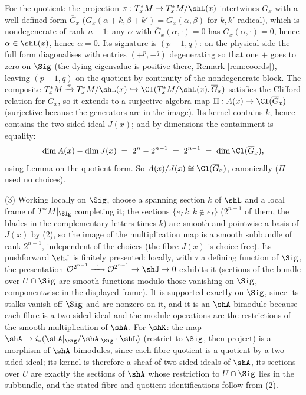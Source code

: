 For the quotient: the projection $\pi : T^*_xM \to T^*_xM/\shL(x)$ intertwines $G_x$ with a well-defined form $\overline{G}_x$ ($G_x(\alpha + k, \beta + k') = G_x(\alpha, \beta)$ for $k, k'$ radical), which is nondegenerate of rank $n - 1$: any $\alpha$ with $\overline{G}_x(\bar\alpha, \cdot) = 0$ has $G_x(\alpha, \cdot) = 0$, hence $\alpha \in \shL(x)$, hence $\bar\alpha = 0$. Its signature is $(p{-}1, q)$: on the physical side the full form diagonalises with entries $(+^{p}, -^{q})$ degenerating so that one $+$ goes to zero on $\Sig$ (the dying eigenvalue is positive there, Remark \ref{rem:coords}), leaving $(p{-}1, q)$ on the quotient by continuity of the nondegenerate block. The composite $T^*_xM \xrightarrow{\pi} T^*_xM/\shL(x) \hookrightarrow \Cl(T^*_xM/\shL(x), \overline{G}_x)$ satisfies the Clifford relation for $G_x$, so it extends to a surjective algebra map $\Pi : A(x) \to \Cl(\overline{G}_x)$ (surjective because the generators are in the image). Its kernel contains $k$, hence contains the two-sided ideal $J(x)$; and by dimensions the containment is equality:
\[
\dim A(x) - \dim J(x) \;=\; 2^n - 2^{n-1} \;=\; 2^{n-1} \;=\; \dim \Cl(\overline{G}_x),
\]
using Lemma  on the quotient form. So $A(x)/J(x) \cong \Cl(\overline{G}_x)$, canonically ($\Pi$ used no choices).

(3) Working locally on $\Sig$, choose a spanning section $k$ of $\shL$ and a local frame of $T^*M|_\Sig$ completing it; the sections $\{e_I\, k : k \notin e_I\}$ ($2^{n-1}$ of them, the blades in the complementary letters times $k$) are smooth and pointwise a basis of $J(x)$ by (2), so the image of the multiplication map is a smooth subbundle of rank $2^{n-1}$, independent of the choices (the fibre $J(x)$ is choice-free). Its pushforward $\shJ$ is finitely presented: locally, with $\tau$ a defining function of $\Sig$, the presentation $\mathcal{O}^{2^{n-1}} \xrightarrow{\ \tau\ } \mathcal{O}^{2^{n-1}} \to \shJ \to 0$ exhibits it (sections of the bundle over $U \cap \Sig$ are smooth functions modulo those vanishing on $\Sig$, componentwise in the displayed frame). It is supported exactly on $\Sig$, since its stalks vanish off $\Sig$ and are nonzero on it, and it is an $\shA$-bimodule because each fibre is a two-sided ideal and the module operations are the restrictions of the smooth multiplication of $\shA$. For $\shK$: the map $\shA \to i_*(\shA|_\Sig / \shA|_\Sig \cdot \shL)$ (restrict to $\Sig$, then project) is a morphism of $\shA$-bimodules, since each fibre quotient is a quotient by a two-sided ideal; its kernel is therefore a sheaf of two-sided ideals of $\shA$, its sections over $U$ are exactly the sections of $\shA$ whose restriction to $U \cap \Sig$ lies in the subbundle, and the stated fibre and quotient identifications follow from (2).
